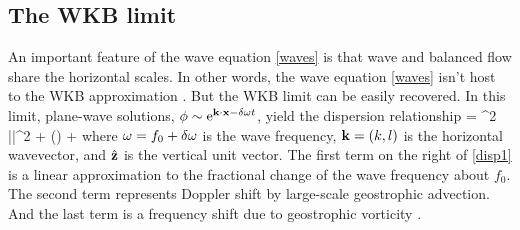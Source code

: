 \documentclass{jfm}
\begin{document}
\subsection{The WKB limit}
An important feature of the wave equation \eqref{waves} is that wave and balanced
flow share the horizontal scales. In other words,
the wave equation \eqref{waves} isn't host to the WKB approximation
\citep[e.g., ][]{young_benjelloul1997}. But the WKB limit can be easily recovered.
In this limit, plane-wave solutions, $\phi \sim {\rm e}^{\mathbf{k} \cdot \mathbf{x} -  \delta\omega t}$,
yield the dispersion relationship
\beq\label{disp1}
 = \half \lambda^2 |\kb|^2 + \zhb\cdot(\kb\times\grad\psi)
 + \lap\psi\com
\eeq
where $\omega = f_0 + \delta\omega$ is the wave frequency, $\mathbf{k} = (k,l)$ is the horizontal
wavevector, and $\hat{\mathbf{z}}$ is the vertical unit vector. The first term on the right
of \eqref{disp1} is a linear approximation to the fractional change of the wave
frequency about $f_0$. The second term represents Doppler shift by large-scale
geostrophic advection. And the last term is a frequency shift due to geostrophic
vorticity \citep{kunze1985,young_benjelloul1997}.
\end{document}

